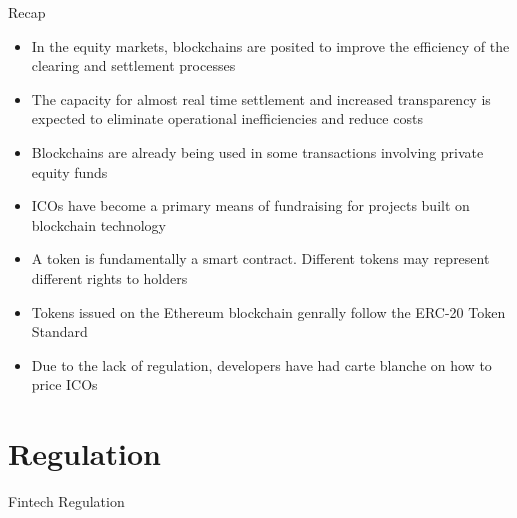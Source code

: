 \documentclass[11pt]{beamer}
\begin{document}

\begin{frame}{Recap}
	\begin{itemize}
		\item In the equity markets, blockchains are posited to improve the efficiency of the clearing and settlement processes
		\item The capacity for almost real time settlement and increased transparency is expected to eliminate operational inefficiencies and reduce costs
		\item Blockchains are already being used in some transactions involving private equity funds
		\item ICOs have become a primary means of fundraising for projects built on blockchain technology
		\item A token is fundamentally a smart contract. Different tokens may represent different rights to holders
		\item Tokens issued on the Ethereum blockchain genrally follow the ERC-20 Token Standard
		\item Due to the lack of regulation, developers have had carte blanche on how to price ICOs
	\end{itemize}
\end{frame}


\section{Regulation}

\begin{frame}
	\begin{center}
		\begin{large}
			Fintech Regulation
		\end{large}
	\end{center}
\end{frame}



\end{document}
